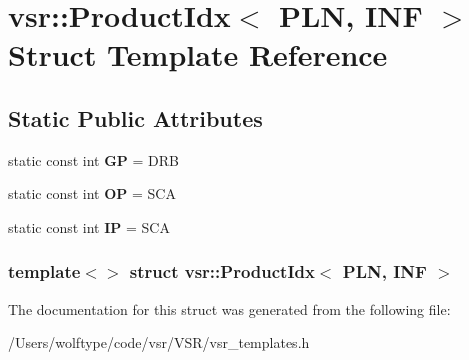 \hypertarget{structvsr_1_1_product_idx_3_01_p_l_n_00_01_i_n_f_01_4}{\section{vsr\-:\-:Product\-Idx$<$ P\-L\-N, I\-N\-F $>$ Struct Template Reference}
\label{structvsr_1_1_product_idx_3_01_p_l_n_00_01_i_n_f_01_4}
}
\subsection*{Static Public Attributes}
\begin{DoxyCompactItemize}
\item 
\hypertarget{structvsr_1_1_product_idx_3_01_p_l_n_00_01_i_n_f_01_4_a528e10a8317939c1fee57c70b720ac1e}{static const int {\bfseries G\-P} = D\-R\-B}\label{structvsr_1_1_product_idx_3_01_p_l_n_00_01_i_n_f_01_4_a528e10a8317939c1fee57c70b720ac1e}

\item 
\hypertarget{structvsr_1_1_product_idx_3_01_p_l_n_00_01_i_n_f_01_4_afc5d19b01ee5c43c11b99ada7c55763a}{static const int {\bfseries O\-P} = S\-C\-A}\label{structvsr_1_1_product_idx_3_01_p_l_n_00_01_i_n_f_01_4_afc5d19b01ee5c43c11b99ada7c55763a}

\item 
\hypertarget{structvsr_1_1_product_idx_3_01_p_l_n_00_01_i_n_f_01_4_ac9d5fda7d8081291bcae65a87180adea}{static const int {\bfseries I\-P} = S\-C\-A}\label{structvsr_1_1_product_idx_3_01_p_l_n_00_01_i_n_f_01_4_ac9d5fda7d8081291bcae65a87180adea}

\end{DoxyCompactItemize}
\subsubsection*{template$<$$>$ struct vsr\-::\-Product\-Idx$<$ P\-L\-N, I\-N\-F $>$}



The documentation for this struct was generated from the following file\-:\begin{DoxyCompactItemize}
\item 
/\-Users/wolftype/code/vsr/\-V\-S\-R/vsr\-\_\-templates.\-h\end{DoxyCompactItemize}
